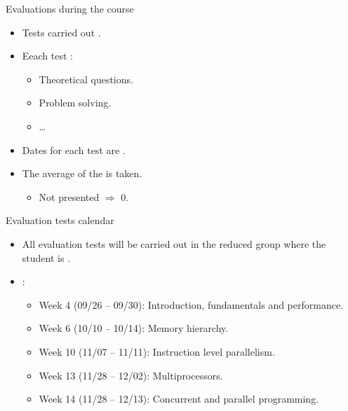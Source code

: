 \begin{frame}[t]{Evaluations during the course}
\begin{itemize}
  \item Tests carried out .

  \item Eeach test :
    \begin{itemize}
      \item Theoretical questions.
      \item Problem solving.
      \item \ldots
    \end{itemize}

  \item Dates for each test are .

  \item The average of the  is taken.
    \begin{itemize}
      \item Not presented $\Rightarrow$ 0.
    \end{itemize}
\end{itemize}
\end{frame}

\begin{frame}[t]{Evaluation tests calendar}
\begin{itemize}
  \item All evaluation tests will be carried out in the reduced group
        where the student is .

  \vfill
  \item {}:
  \begin{itemize}
    \item Week 4 (09/26 -- 09/30): Introduction, fundamentals and performance.
    \item Week 6 (10/10 -- 10/14): Memory hierarchy.
    \item Week 10 (11/07 -- 11/11): Instruction level parallelism.
    \item Week 13 (11/28 -- 12/02): Multiprocessors.
    \item Week 14 (11/28 -- 12/13): Concurrent and parallel programming.
  \end{itemize}
\end{itemize}
\end{frame}


